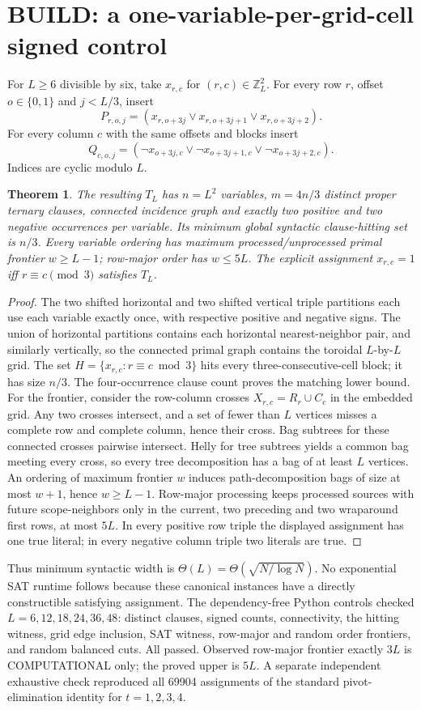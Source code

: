 \documentclass[11pt]{article}
\newtheorem{theorem}{Theorem}
\begin{document}
\section{BUILD: a one-variable-per-grid-cell signed control}
For $L\ge6$ divisible by six, take $x_{r,c}$ for $(r,c)\in\mathbb Z_L^2$. For every row $r$, offset $o\in\{0,1\}$ and $j<L/3$, insert
\[
P_{r,o,j}=(x_{r,o+3j}\vee x_{r,o+3j+1}\vee x_{r,o+3j+2}).
\]
For every column $c$ with the same offsets and blocks insert
\[
Q_{c,o,j}=(\neg x_{o+3j,c}\vee\neg x_{o+3j+1,c}\vee\neg x_{o+3j+2,c}).
\]
Indices are cyclic modulo $L$.
\begin{theorem}
The resulting $T_L$ has $n=L^2$ variables, $m=4n/3$ distinct proper ternary clauses, connected incidence graph and exactly two positive and two negative occurrences per variable. Its minimum global syntactic clause-hitting set is $n/3$. Every variable ordering has maximum processed/unprocessed primal frontier $w\ge L-1$; row-major order has $w\le5L$. The explicit assignment $x_{r,c}=1$ iff $r\equiv c\pmod3$ satisfies $T_L$.
\end{theorem}
\begin{proof}
The two shifted horizontal and two shifted vertical triple partitions each use each variable exactly once, with respective positive and negative signs. The union of horizontal partitions contains each horizontal nearest-neighbor pair, and similarly vertically, so the connected primal graph contains the toroidal $L$-by-$L$ grid. The set $H=\{x_{r,c}:r\equiv c\bmod3\}$ hits every three-consecutive-cell block; it has size $n/3$. The four-occurrence clause count proves the matching lower bound.
For the frontier, consider the row-column crosses $X_{r,c}=R_r\cup C_c$ in the embedded grid. Any two crosses intersect, and a set of fewer than $L$ vertices misses a complete row and complete column, hence their cross. Bag subtrees for these connected crosses pairwise intersect. Helly for tree subtrees yields a common bag meeting every cross, so every tree decomposition has a bag of at least $L$ vertices. An ordering of maximum frontier $w$ induces path-decomposition bags of size at most $w+1$, hence $w\ge L-1$. Row-major processing keeps processed sources with future scope-neighbors only in the current, two preceding and two wraparound first rows, at most $5L$. In every positive row triple the displayed assignment has one true literal; in every negative column triple two literals are true.
\end{proof}
Thus minimum syntactic width is $\Theta(L)=\Theta(\sqrt{N/\log N})$. No exponential SAT runtime follows because these canonical instances have a directly constructible satisfying assignment. The dependency-free Python controls checked $L=6,12,18,24,36,48$: distinct clauses, signed counts, connectivity, the hitting witness, grid edge inclusion, SAT witness, row-major and random order frontiers, and random balanced cuts. All passed. Observed row-major frontier exactly $3L$ is COMPUTATIONAL only; the proved upper is $5L$. A separate independent exhaustive check reproduced all 69904 assignments of the standard pivot-elimination identity for $t=1,2,3,4$.
\end{document}
